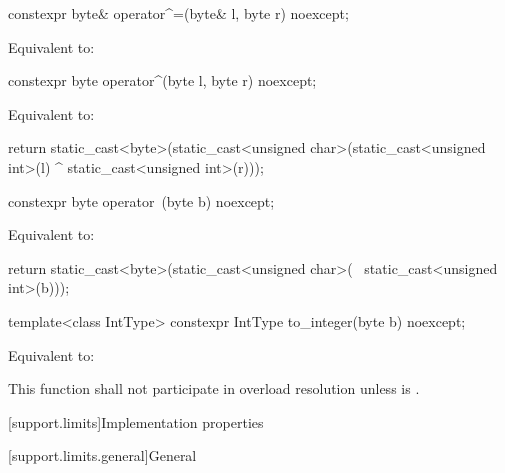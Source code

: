%
\begin{itemdecl}
constexpr byte& operator^=(byte& l, byte r) noexcept;
\end{itemdecl}

\begin{itemdescr}
\pnum \effects Equivalent to: 
\end{itemdescr}

%
\begin{itemdecl}
constexpr byte operator^(byte l, byte r) noexcept;
\end{itemdecl}

\begin{itemdescr}
\pnum \effects Equivalent to:
\begin{codeblock}
return static_cast<byte>(static_cast<unsigned char>(static_cast<unsigned int>(l) ^
                                                    static_cast<unsigned int>(r)));
\end{codeblock}
\end{itemdescr}

%
\begin{itemdecl}
constexpr byte operator~(byte b) noexcept;
\end{itemdecl}

\begin{itemdescr}
\pnum \effects Equivalent to:
\begin{codeblock}
return static_cast<byte>(static_cast<unsigned char>(
	                   ~static_cast<unsigned int>(b)));
\end{codeblock}
\end{itemdescr}

%
\begin{itemdecl}
template<class IntType>
  constexpr IntType to_integer(byte b) noexcept;
\end{itemdecl}

\begin{itemdescr}
\pnum \effects Equivalent to: 

\pnum \remarks This function shall not participate in overload resolution unless
 is .
\end{itemdescr}

[support.limits]{Implementation properties}

[support.limits.general]{General}


